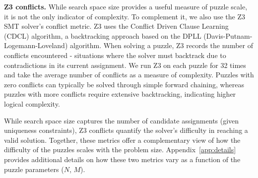 


\textbf{Z3 conflicts.}
While search space size provides a useful measure of puzzle scale, it is not the only indicator of complexity.
To complement it, we also use the Z3 SMT solver's conflict metric. Z3 \citep{demoura2008z3} uses the Conflict Driven Clause Learning (CDCL) algorithm, a backtracking approach based on the DPLL (Davis-Putnam-Logemann-Loveland) algorithm. When solving a puzzle, Z3 records the number of conflicts encountered - situations where the solver must backtrack due to contradictions in its current assignment. We run Z3 on each puzzle for 32 times and take the average number of conflicts as a measure of complexity. 
Puzzles with zero conflicts can typically be solved through simple forward chaining, whereas puzzles with more conflicts require extensive backtracking, indicating higher logical complexity. %





While search space size captures the number of candidate assignments (given uniqueness constraints), Z3 conflicts quantify the solver’s difficulty in reaching a valid solution. Together, these metrics offer a complementary view of how the difficulty of the puzzles scales with the problem size. %
Appendix~\ref{app:details} provides additional details on how these two metrics vary as a function of the puzzle parameters ($N$, $M$). 




